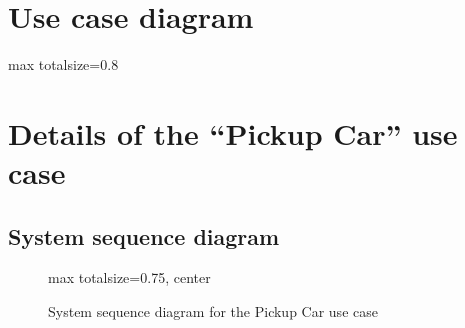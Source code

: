 \documentclass[12pt,a4paper]{report}
\begin{document}

\clearpage
\section{Use case diagram}

\begin{center}
\begin{adjustbox}{max totalsize={\linewidth}{0.8\textheight}}
\end{adjustbox}
\label{fig:usecase-diagram}
\end{center}

\section{Details of the ``Pickup Car'' use case}
\subsection{System sequence diagram}

\begin{figure}[H]
    \centering
    \begin{adjustbox}{
        max totalsize={\textwidth}{0.75\textheight},
        center
    }
    \end{adjustbox}
    \caption{System sequence diagram for the Pickup Car use case}
\end{figure}
\end{document}
